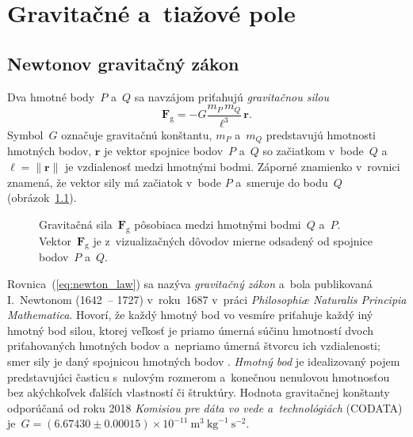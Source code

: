 \documentclass[a4paper, 12pt]{book}
\newcommand{\gidx}{\mathrm g}
\let\vec\mathbf
\begin{document}

\chapter{Gravitačné a~tiažové pole}
\label{sec:gravitational_and_gravity_field}






\section{Newtonov gravitačný zákon}
\label{sec:newton_law}

Dva hmotné body~$P$ a~$Q$ sa navzájom priťahujú \emph{gravitačnou silou}
%
\begin{equation}
\label{eq:newton_law}
\vec F_\gidx = -G \frac{m_P \, m_Q}{\ell^3} \, \vec{r}{.}
\end{equation}
%
Symbol~$G$ označuje gravitačnú konštantu, $m_P$ a~$m_Q$ predstavujú hmotnosti 
hmotných bodov, $\vec r$ je vektor spojnice bodov~$P$ a~$Q$ so začiatkom 
v~bode~$Q$ a~$\ell = \| \vec r \|$ je vzdialenosť medzi hmotnými bodmi.  
Záporné znamienko v~rovnici znamená, že vektor sily má začiatok v~bode $P$ 
a~smeruje do bodu~$Q$ (obrázok~\ref{fig:newton_law}).

\begin{figure}[b]
\centering

\caption{Gravitačná sila~$\vec F_\gidx$ pôsobiaca medzi hmotnými bodmi~$Q$ 
a~$P$.  Vektor~$\vec F_\gidx$ je z~vizualizačných dôvodov mierne odsadený od 
spojnice bodov~$P$ a~$Q$.}
\label{fig:newton_law}
\end{figure}

Rovnica~(\ref{eq:newton_law}) sa nazýva \emph{gravitačný zákon} a~bola 
publikovaná I.~Newtonom (1642~-- 1727) v~roku~1687 v~práci \emph{Philosophi\ae 
Naturalis Principia Mathematica}.  Hovorí, že každý hmotný bod vo vesmíre 
priťahuje každý iný hmotný bod silou, ktorej veľkosť je priamo úmerná súčinu 
hmotností dvoch priťahovaných hmotných bodov a~nepriamo úmerná štvorcu ich 
vzdialenosti; smer sily je daný spojnicou hmotných bodov 
\parencite{Kellogg1967}.  \emph{Hmotný bod} je idealizovaný pojem predstavujúci 
časticu s~nulovým rozmerom a~konečnou nenulovou hmotnosťou bez akýchkoľvek 
ďalších vlastností či štruktúry.  Hodnota gravitačnej konštanty odporúčaná od 
roku 2018 \emph{Komisiou pre dáta vo vede a~technológiách} (CODATA) je~$G 
= (6.67430 \pm 0.00015) \times 10^{-11} \ \mathrm{m}^3 \ \mathrm{kg}^{-1} 
\ \mathrm{s}^{-2}$.
\end{document}
